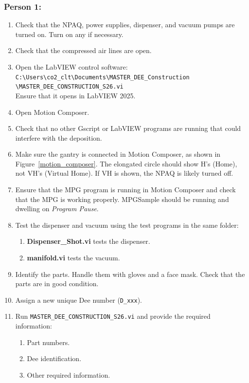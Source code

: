 \documentclass[12pt]{cornelltfpxsop}
\begin{document}
\subsubsection*{Person 1:}
\begin{enumerate}
    \item Check that the NPAQ, power supplies, dispenser, and vacuum pumps are turned on. Turn on any if necessary.
    \item Check that the compressed air lines are open.
    \item Open the LabVIEW control software:\\
    \verb|C:\Users\co2_clt\Documents\MASTER_DEE_Construction|\\
    \verb|\MASTER_DEE_CONSTRUCTION_S26.vi|\\
    Ensure that it opens in LabVIEW 2025.
    \item Open Motion Composer.
    \item Check that no other Gscript or LabVIEW programs are running that could interfere with the deposition.
    \item Make sure the gantry is connected in Motion Composer, as shown in Figure~\ref{motion_composer}. The elongated circle should show H's (Home), not VH's (Virtual Home). If VH is shown, the NPAQ is likely turned off.
    \item Ensure that the MPG program is running in Motion Composer and check that the MPG is working properly. MPGSample should be running and dwelling on \textit{Program Pause}.
    \item Test the dispenser and vacuum using the test programs in the same folder:
    \begin{enumerate}
        \item \textbf{Dispenser\_Shot.vi} tests the dispenser.
        \item \textbf{manifold.vi} tests the vacuum.
    \end{enumerate}
    \item Identify the parts. Handle them with gloves and a face mask. Check that the parts are in good condition.
    \item Assign a new unique Dee number (\texttt{D\_xxx}).
    \item Run \verb|MASTER_DEE_CONSTRUCTION_S26.vi| and provide the required information:
    \begin{enumerate}
        \item Part numbers.
        \item Dee identification.
        \item Other required information.

\end{enumerate}
\end{enumerate}
\end{document}
